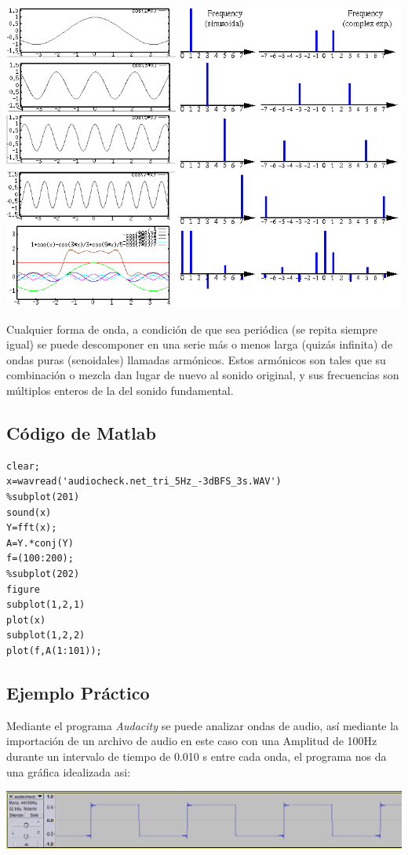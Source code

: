 \documentclass[10pt,a4paper]{book}
\begin{document}
\begin{center}
	\includegraphics[scale=0.45]{AudioFourier.png}\\
\end{center}

Cualquier forma de onda, a condición de que sea periódica (se repita siempre igual) se puede descomponer en una serie más o menos larga (quizás infinita) de ondas puras (senoidales) llamadas armónicos. Estos armónicos son tales que su combinación o mezcla dan lugar de nuevo al sonido original, y sus frecuencias son múltiplos enteros de la del sonido fundamental.\\

\subsection{Código de Matlab}

\begin{verbatim}
clear;
x=wavread('audiocheck.net_tri_5Hz_-3dBFS_3s.WAV')
%subplot(201)
sound(x)
Y=fft(x);
A=Y.*conj(Y)
f=(100:200);
%subplot(202)
figure
subplot(1,2,1)
plot(x)
subplot(1,2,2)
plot(f,A(1:101));

\end{verbatim}

\subsection{Ejemplo Práctico}

Mediante el programa \textit{Audacity} se puede analizar ondas de audio, así mediante la importación de un archivo de audio en este caso con una Amplitud de 100Hz durante un intervalo de tiempo de 0.010 s entre cada onda, el programa nos da una gráfica idealizada asi:
\begin{center}
	\includegraphics[scale=0.5]{Cuadrada.png} 
\end{center}
\end{document}
